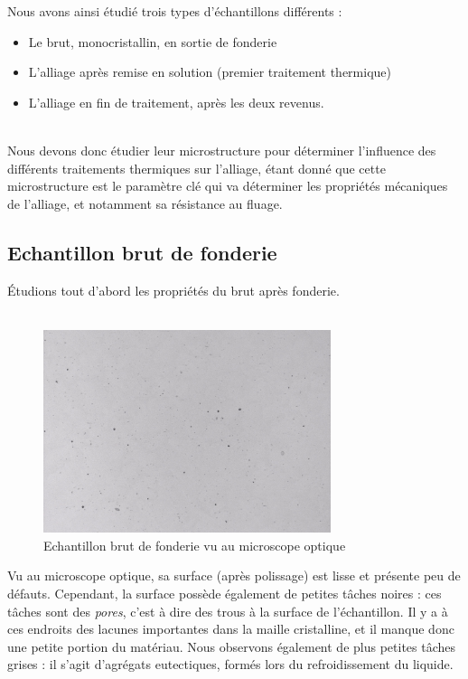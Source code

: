Nous avons ainsi étudié trois types d'échantillons différents :\\
\begin{itemize}
    \item Le brut, monocristallin, en sortie de fonderie
    \item L'alliage après remise en solution (premier traitement thermique)
    \item L'alliage en fin de traitement, après les deux revenus.\\\\
\end{itemize}



Nous devons donc étudier leur microstructure pour déterminer l'influence des 
différents traitements thermiques sur l'alliage, étant donné que cette microstructure
est le paramètre clé qui va déterminer les propriétés mécaniques de l'alliage,
et notamment sa résistance au fluage.

\subsection*{Echantillon brut de fonderie}

Étudions tout d'abord les propriétés du brut après fonderie.\\\\


\begin{figure}[htbp]
    \centering
    \includegraphics[width=0.75\textwidth]{images_optique/brut.pdf}
    \caption{Echantillon brut de fonderie vu au microscope optique}
    \label{}
\end{figure}


Vu au microscope optique, sa surface (après polissage) est lisse
et présente peu de défauts. Cependant, la surface possède 
également de petites tâches noires : ces tâches sont des \emph{pores},
c'est à dire des trous à la surface de l'échantillon. Il y a à ces endroits 
des lacunes importantes dans la maille cristalline, et il manque donc 
une petite portion du matériau. Nous observons également de plus 
petites tâches grises : il s'agit d'agrégats eutectiques, formés lors du refroidissement du liquide.



